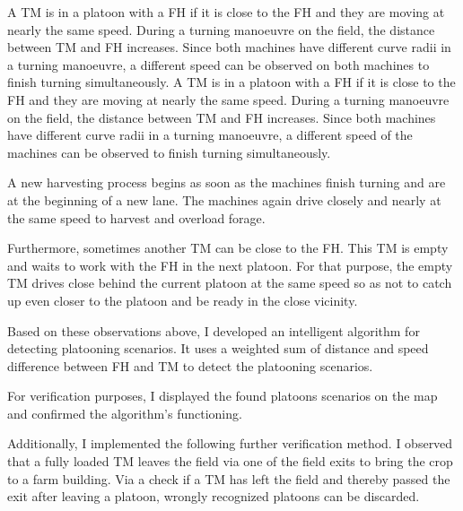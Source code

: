 \documentclass[]{nsm-thesis}
\begin{document}
A \ac{TM} is in a platoon with a  \ac{FH} if it is close to the \ac{FH} and they are moving at nearly the same speed. During a turning manoeuvre on the field, the distance between \ac{TM} and \ac{FH} increases. Since both machines have different curve radii in a turning manoeuvre, a different speed can be observed on both machines to finish turning simultaneously.
A \ac{TM} is in a platoon with a  \ac{FH} if it is close to the \ac{FH} and they are moving at nearly the same speed. During a turning manoeuvre on the field, the distance between \ac{TM} and \ac{FH} increases. Since both machines have different curve radii in a turning manoeuvre, a different speed of the machines can be observed to finish turning simultaneously.

A new harvesting process begins as soon as the machines finish turning and are at the beginning of a new lane.
The machines again drive closely and nearly at the same speed to harvest and overload forage.

Furthermore, sometimes another \ac{TM} can be close to the \ac{FH}. This \ac{TM} is empty and waits to work with the \ac{FH} in the next platoon. For that purpose, the empty \ac{TM} drives close behind the current platoon at the same speed so as not to catch up even closer to the platoon and be ready in the close vicinity.

Based on these observations above, I developed an intelligent algorithm for detecting platooning scenarios. It uses a weighted sum of distance and speed difference between \ac{FH} and \ac{TM} to detect the platooning scenarios.

For verification purposes, I displayed the found platoons scenarios on the map and confirmed the algorithm's functioning. 

Additionally, I implemented the following further verification method. 
I observed that a fully loaded \ac{TM} leaves the field via one of the field exits to bring the crop to a farm building. Via a
check if a \ac{TM} has left the field and thereby passed the exit after leaving a platoon,
wrongly recognized platoons can be discarded.
\end{document}
